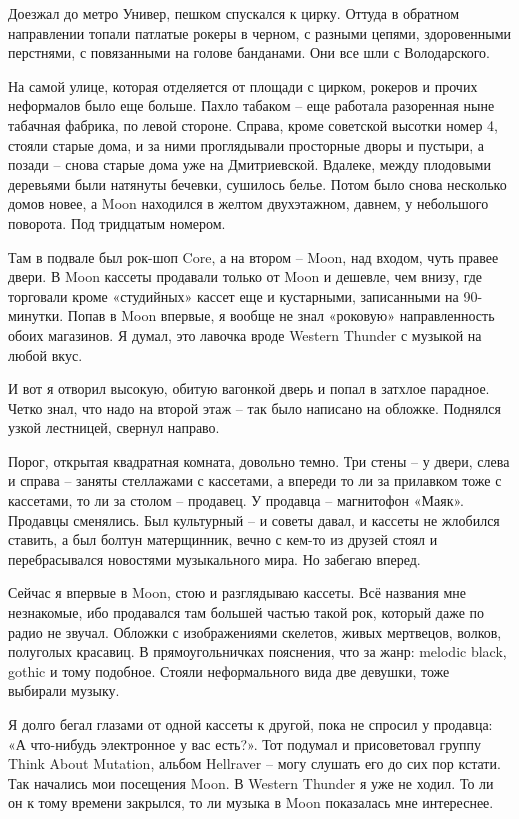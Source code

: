 Доезжал до метро Универ, пешком спускался к цирку. Оттуда в обратном направлении топали патлатые рокеры в черном, с разными цепями, здоровенными перстнями, с повязанными на голове банданами. Они все шли с Володарского. 

На самой улице, которая отделяется от площади с цирком, рокеров и прочих неформалов было еще больше. Пахло табаком – еще работала разоренная ныне табачная фабрика, по левой стороне. Справа, кроме советской высотки номер 4, стояли старые дома, и за ними проглядывали просторные дворы и пустыри, а позади – снова старые дома уже на Дмитриевской. Вдалеке, между плодовыми деревьями были натянуты бечевки, сушилось белье. Потом было снова несколько домов новее, а Moon находился в желтом двухэтажном, давнем, у небольшого поворота. Под тридцатым номером.

Там в подвале был рок-шоп Core, а на втором – Moon, над входом, чуть правее двери. В Moon кассеты продавали только от Moon и дешевле, чем внизу, где торговали кроме «студийных» кассет еще и кустарными, записанными на 90-минутки. Попав в Moon впервые, я вообще не знал «роковую» направленность обоих магазинов. Я думал, это лавочка вроде Western Thunder с музыкой на любой вкус.

И вот я отворил высокую, обитую вагонкой дверь и попал в затхлое парадное. Четко знал, что надо на второй этаж – так было написано на обложке. Поднялся узкой лестницей, свернул направо.

Порог, открытая квадратная комната, довольно темно. Три стены – у двери, слева и справа – заняты стеллажами с кассетами, а впереди то ли за прилавком тоже с кассетами, то ли за столом – продавец. У продавца – магнитофон «Маяк». Продавцы сменялись. Был культурный – и советы давал, и кассеты не жлобился ставить, а был болтун матерщинник, вечно с кем-то из друзей стоял и перебрасывался новостями музыкального мира. Но забегаю вперед.

Сейчас я впервые в Moon, стою и разглядываю кассеты. Всё названия мне незнакомые, ибо продавался там большей частью такой рок, который даже по радио не звучал. Обложки с изображениями скелетов, живых мертвецов, волков, полуголых красавиц. В прямоугольничках пояснения, что за жанр: melodic black, gothic и тому подобное. Стояли неформального вида две девушки, тоже выбирали музыку.

Я долго бегал глазами от одной кассеты к другой, пока не спросил у продавца: «А что-нибудь электронное у вас есть?». Тот подумал и присоветовал группу Think About Mutation, альбом Hellraver – могу слушать его до сих пор кстати. Так начались мои посещения Moon. В Western Thunder я уже не ходил. То ли он к тому времени закрылся, то ли музыка в Moon показалась мне интереснее.

